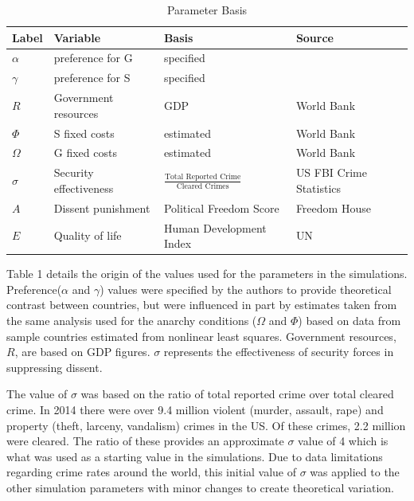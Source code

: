 \documentclass[12pt]{article}
\begin{document}
\begin{spacing}{1.5}
\begin{table}[]
\centering
\footnotesize

\begin{tabular}{llll}
\toprule
\textbf{Label} & \textbf{Variable} & \textbf{Basis} & \textbf{Source} \\ \hline
$\alpha$ & preference for G & specified &  \\
\textbf{$\gamma$} & preference for S & specified &  \\
\textbf{$R$} & Government resources & GDP & World Bank \\
$\Phi$ & S fixed costs & estimated & World Bank \\
\textbf{$\Omega$} & G fixed costs & estimated & World Bank \\
\textbf{$\sigma$} & Security effectiveness & $\frac{\text{Total Reported Crime}}{\text{Cleared Crimes}}$ & US FBI Crime Statistics \\
\textbf{$A$} & Dissent punishment & Political Freedom Score & Freedom House \\
\textbf{$E$} & Quality of life & Human Development Index & UN \\ \hline

\end{tabular}
\caption{Parameter Basis}
\end{table}

Table 1 details the origin of the values used for the parameters in the simulations. Preference($\alpha$ and $\gamma$) values were specified by the authors to provide theoretical contrast between countries, but were influenced in part by estimates taken from the same analysis used for the anarchy conditions ($\Omega$ and $\Phi$) based on data from sample countries estimated from nonlinear least squares. Government resources, $R$, are based on GDP figures. $\sigma$ represents the effectiveness of security forces in suppressing dissent. 

The value of $\sigma$ was based on the ratio of total reported crime over total cleared crime. In 2014 there were over 9.4 million violent (murder, assault, rape) and property (theft, larceny, vandalism) crimes in the US. Of these crimes, 2.2 million were cleared. The ratio of these provides an approximate $\sigma$ value of 4 which is what was used as a starting value in the simulations. Due to data limitations regarding crime rates around the world, this initial value of $\sigma$ was applied to the other simulation parameters with minor changes to create theoretical variation. 


\end{spacing}
\end{document}
